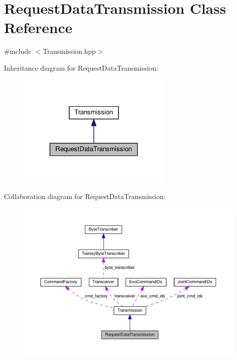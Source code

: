 \hypertarget{classRequestDataTransmission}{}\section{Request\+Data\+Transmission Class Reference}
\label{classRequestDataTransmission}


{\ttfamily \#include $<$Transmission.\+hpp$>$}



Inheritance diagram for Request\+Data\+Transmission\+:\nopagebreak
\begin{figure}[H]
\begin{center}
\leavevmode
\includegraphics[width=213pt]{classRequestDataTransmission__inherit__graph}
\end{center}
\end{figure}


Collaboration diagram for Request\+Data\+Transmission\+:\nopagebreak
\begin{figure}[H]
\begin{center}
\leavevmode
\includegraphics[width=350pt]{classRequestDataTransmission__coll__graph}
\end{center}
\end{figure}
